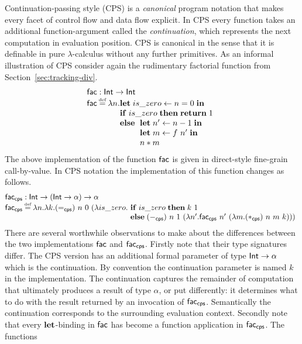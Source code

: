 \documentclass[12pt,phd,lfcs,twoside,openright,logo,leftchapter,normalheadings]{infthesis}
\theoremstyle{plain}
\theoremstyle{definition}
\begin{document}
Continuation-passing style (CPS) is a \emph{canonical} program
notation that makes every facet of control flow and data flow
explicit. In CPS every function takes an additional function-argument
called the \emph{continuation}, which represents the next computation
in evaluation position. CPS is canonical in the sense that it is
definable in pure $\lambda$-calculus without any further
primitives. As an informal illustration of CPS consider again the
rudimentary factorial function from Section~\ref{sec:tracking-div}.
%
\[
  \bl
    \dec{fac} : \Int \to \Int\\
    \dec{fac} \defas \lambda n.
       \ba[t]{@{}l}
         \Let\;is\_zero \revto n = 0\;\In\\
         \If\;is\_zero\;\Then\; \Return\;1\\
         \Else\;\ba[t]{@{~}l}
                   \Let\; n' \revto n - 1 \;\In\\
                   \Let\; m \revto f~n' \;\In\\
                   n * m
                 \ea
       \ea
  \el
\]
%
The above implementation of the function $\mathsf{fac}$ is given in
direct-style fine-grain call-by-value. In CPS notation the
implementation of this function changes as follows.
%
\[
  \bl
  \dec{fac}_{\dec{cps}} : \Int \to (\Int \to \alpha) \to \alpha\\
  \dec{fac}_{\dec{cps}} \defas \lambda n.\lambda k.
     (=_{\dec{cps}})~n~0~
       (\lambda is\_zero.
          \ba[t]{@{~}l}
          \If\;is\_zero\;\Then\; k~1\\
          \Else\;
          (-_{\dec{cps}})~n~1~
            (\lambda n'.
               \dec{fac}_{\dec{cps}}~n'~
                  (\lambda m. (*_{\dec{cps}})~n~m~k)))
          \ea
  \el
\]
%
There are several worthwhile observations to make about the
differences between the two implementations $\mathsf{fac}$ and
$\mathsf{fac}_{\mathsf{cps}}$.
%
Firstly note that their type signatures differ. The CPS version has an
additional formal parameter of type $\mathsf{Int} \to \alpha$ which is the
continuation. By convention the continuation parameter is named $k$ in
the implementation. The continuation captures the remainder of
computation that ultimately produces a result of type $\alpha$, or put
differently: it determines what to do with the result returned by an
invocation of $\mathsf{fac}_{\mathsf{cps}}$. Semantically the continuation corresponds
to the surrounding evaluation
context.
%
Secondly note that every $\mathbf{let}$-binding in $\mathsf{fac}$ has become a
function application in $\mathsf{fac}_{\mathsf{cps}}$. The functions
\end{document}
